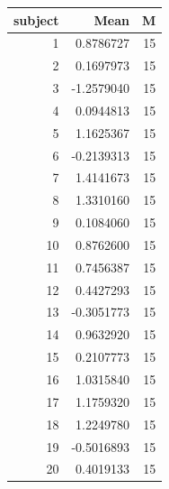 \documentclass{article}\usepackage[]{graphicx}\usepackage[]{color}
\begin{document}
\begin{table}[ht]
\centering
\begin{tabular}{rrr}
  \hline
subject & Mean & M \\ 
  \hline
       1 & 0.8786727 &       15 \\ 
         2 & 0.1697973 &       15 \\ 
         3 & -1.2579040 &       15 \\ 
         4 & 0.0944813 &       15 \\ 
         5 & 1.1625367 &       15 \\ 
         6 & -0.2139313 &       15 \\ 
         7 & 1.4141673 &       15 \\ 
         8 & 1.3310160 &       15 \\ 
         9 & 0.1084060 &       15 \\ 
        10 & 0.8762600 &       15 \\ 
        11 & 0.7456387 &       15 \\ 
        12 & 0.4427293 &       15 \\ 
        13 & -0.3051773 &       15 \\ 
        14 & 0.9632920 &       15 \\ 
        15 & 0.2107773 &       15 \\ 
        16 & 1.0315840 &       15 \\ 
        17 & 1.1759320 &       15 \\ 
        18 & 1.2249780 &       15 \\ 
        19 & -0.5016893 &       15 \\ 
        20 & 0.4019133 &       15 \\ 
   \hline
\end{tabular}
\end{table}
\end{document}
